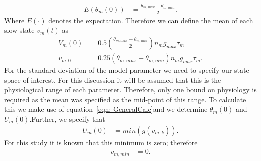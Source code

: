 \begin{align}
E(\theta_{m}(0)) &= \frac{\theta_{m,max} -\theta_{m,min}}{2}. \end{align} Where $E(\cdot)$ denotes the expectation. Therefore we can define the mean of each slow state $v_{m}(t)$ as \begin{align} %
V_{m}(0) &= 0.5\left(\frac{\theta_{m,max} -\theta_{m,min}}{2}\right)n_{m}g_{max}\tau_{m}\\
\label{eqn: MeanCalc}
\overline{v}_{m,0} &= 0.25\left(\theta_{m,max} -\theta_{m,min}\right)n_{m}g_{max}\tau_{m}. \end{align} For the standard deviation of the model parameter we need to specify our state space of interest. For this discussion it will be assumed that this is the physiological range of each parameter. Therefore, only one bound on physiology is required as the mean was specified as the mid-point of this range. To calculate this we make use of equation~\ref{eqn: GeneralCalc}and we determine $\theta_{m}(0)$ and $U_{m}(0)$.Further, we specify that \begin{align} %
U_{m}(0) &= min(g(v_{m,k})). \end{align} For this study it is known that this minimum is zero; therefore \begin{align}
v_{m,min} &= 0. \end{align} 


